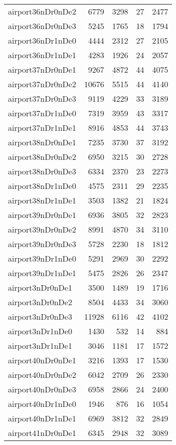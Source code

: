 \begin{longtable}{lrrrr}
airport36nDr0nDe2 & 6779 & 3298 & 27 & 2477 \\
airport36nDr0nDe3 & 5245 & 1765 & 18 & 1794 \\
airport36nDr1nDe0 & 4444 & 2312 & 27 & 2105 \\
airport36nDr1nDe1 & 4283 & 1926 & 24 & 2057 \\
airport37nDr0nDe1 & 9267 & 4872 & 44 & 4075 \\
airport37nDr0nDe2 & 10676 & 5515 & 44 & 4140 \\
airport37nDr0nDe3 & 9119 & 4229 & 33 & 3189 \\
airport37nDr1nDe0 & 7319 & 3959 & 43 & 3317 \\
airport37nDr1nDe1 & 8916 & 4853 & 44 & 3743 \\
airport38nDr0nDe1 & 7235 & 3730 & 37 & 3192 \\
airport38nDr0nDe2 & 6950 & 3215 & 30 & 2728 \\
airport38nDr0nDe3 & 6334 & 2370 & 23 & 2273 \\
airport38nDr1nDe0 & 4575 & 2311 & 29 & 2235 \\
airport38nDr1nDe1 & 3503 & 1382 & 21 & 1824 \\
airport39nDr0nDe1 & 6936 & 3805 & 32 & 2823 \\
airport39nDr0nDe2 & 8991 & 4870 & 34 & 3110 \\
airport39nDr0nDe3 & 5728 & 2230 & 18 & 1812 \\
airport39nDr1nDe0 & 5291 & 2969 & 30 & 2292 \\
airport39nDr1nDe1 & 5475 & 2826 & 26 & 2347 \\
airport3nDr0nDe1 & 3500 & 1489 & 19 & 1716 \\
airport3nDr0nDe2 & 8504 & 4433 & 34 & 3060 \\
airport3nDr0nDe3 & 11928 & 6116 & 42 & 4102 \\
airport3nDr1nDe0 & 1430 & 532 & 14 & 884 \\
airport3nDr1nDe1 & 3046 & 1181 & 17 & 1572 \\
airport40nDr0nDe1 & 3216 & 1393 & 17 & 1530 \\
airport40nDr0nDe2 & 6042 & 2709 & 26 & 2330 \\
airport40nDr0nDe3 & 6958 & 2866 & 24 & 2400 \\
airport40nDr1nDe0 & 1946 & 876 & 16 & 1054 \\
airport40nDr1nDe1 & 6969 & 3812 & 32 & 2849 \\
airport41nDr0nDe1 & 6345 & 2948 & 32 & 3089 \\

\end{longtable}

